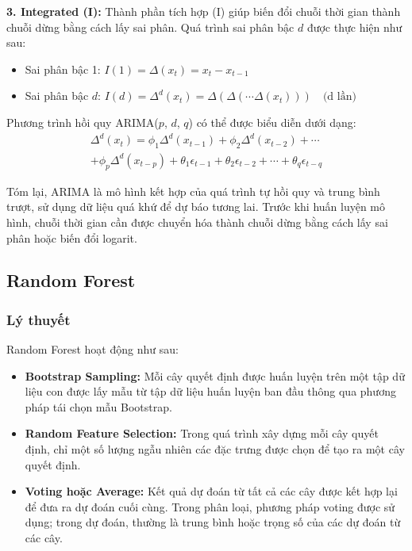 \documentclass[conference]{IEEEtran}
\begin{document}
\textbf{3. Integrated (I):}
Thành phần tích hợp (I) giúp biến đổi chuỗi thời gian thành chuỗi dừng bằng cách lấy sai phân. Quá trình sai phân bậc $d$ được thực hiện như sau:
\begin{itemize}
  \item Sai phân bậc 1: $I(1) = \Delta(x_t) = x_t - x_{t-1}$
  \item Sai phân bậc $d$: $I(d) = \Delta^d(x_t) = \Delta(\Delta(\cdots \Delta(x_t))) \quad \text{(d lần)}$
\end{itemize}

Phương trình hồi quy ARIMA($p$, $d$, $q$) có thể được biểu diễn dưới dạng:
\begin{multline}
\Delta^d(x_t) = \phi_1 \Delta^d(x_{t-1}) + \phi_2 \Delta^d(x_{t-2}) + \cdots \\
+ \phi_p \Delta^d(x_{t-p}) + \theta_1 \epsilon_{t-1} + \theta_2 \epsilon_{t-2} + \cdots + \theta_q \epsilon_{t-q}
\end{multline}


Tóm lại, ARIMA là mô hình kết hợp của quá trình tự hồi quy và trung bình trượt, sử dụng dữ liệu quá khứ để dự báo tương lai. Trước khi huấn luyện mô hình, chuỗi thời gian cần được chuyển hóa thành chuỗi dừng bằng cách lấy sai phân hoặc biến đổi logarit.

\subsection{Random Forest}

\subsubsection{Lý thuyết}

Random Forest hoạt động như sau:

\begin{itemize}
  \item \textbf{Bootstrap Sampling:} Mỗi cây quyết định được huấn luyện trên một tập dữ liệu con được lấy mẫu từ tập dữ liệu huấn luyện ban đầu thông qua phương pháp tái chọn mẫu Bootstrap.
  
  \item \textbf{Random Feature Selection:} Trong quá trình xây dựng mỗi cây quyết định, chỉ một số lượng ngẫu nhiên các đặc trưng được chọn để tạo ra một cây quyết định.
  
  \item \textbf{Voting hoặc Average:} Kết quả dự đoán từ tất cả các cây được kết hợp lại để đưa ra dự đoán cuối cùng. Trong phân loại, phương pháp voting được sử dụng; trong dự đoán, thường là trung bình hoặc trọng số của các dự đoán từ các cây.
\end{itemize}
\end{document}
